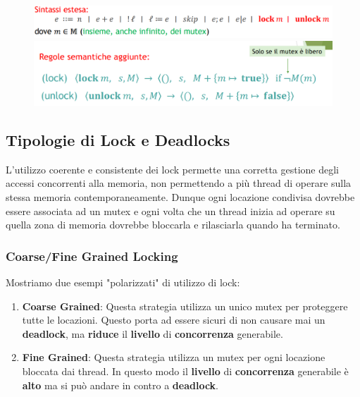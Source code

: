 \documentclass{article}
\begin{document}
\begin{figure}[htbp]
    \center
    \includegraphics[scale=0.3]{img/sintassi2_modello.png}
    \includegraphics[scale=0.3]{img/semantica4_modello.png}
\end{figure}

\newpage

\subsection{Tipologie di Lock e Deadlocks}

L'utilizzo coerente e consistente dei lock permette una corretta gestione degli accessi concorrenti alla memoria, non permettendo a più thread di operare sulla stessa memoria contemporaneamente. Dunque ogni locazione condivisa dovrebbe essere associata ad un mutex e ogni volta che un thread inizia ad operare su quella zona di memoria dovrebbe bloccarla e rilasciarla quando ha terminato.

\subsubsection{Coarse/Fine Grained Locking}

Mostriamo due esempi "polarizzati" di utilizzo di lock:

\begin{enumerate}
    \item \textbf{Coarse Grained}: Questa strategia utilizza un unico mutex per proteggere tutte le locazioni. Questo porta ad essere sicuri di non causare mai un \textbf{deadlock}, ma \textbf{riduce} il \textbf{livello} di \textbf{concorrenza} generabile.
    \item \textbf{Fine Grained}: Questa strategia utilizza un mutex per ogni locazione bloccata dai thread. In questo modo il \textbf{livello} di \textbf{concorrenza} generabile è \textbf{alto} ma si può andare in contro a \textbf{deadlock}.
\end{enumerate}
\end{document}

